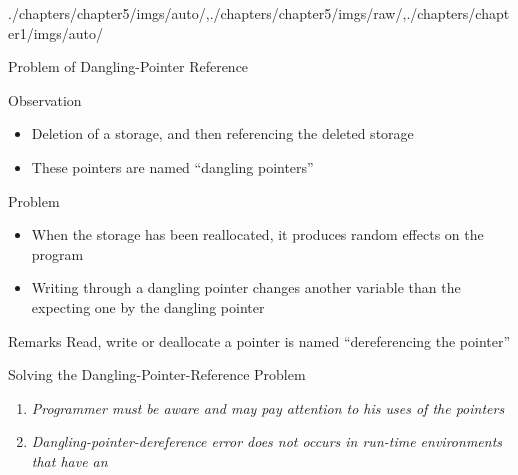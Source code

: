 \begin{graphicspathcontext}{{./chapters/chapter5/imgs/auto/},{./chapters/chapter5/imgs/raw/},{./chapters/chapter1/imgs/auto/}}
\begin{bibunit}[apalike]
\begin{frame}{Problem of Dangling-Pointer Reference}
	\begin{small}
		\begin{block}{Observation}
			\begin{itemize}
				\item Deletion of a storage, and then referencing the deleted storage
				\item These pointers are named ``dangling pointers''
			\end{itemize}
		\end{block}
		\begin{alertblock}{Problem}
			\begin{itemize}
				\item When the storage has been reallocated, it produces random effects on the program
				\item Writing through a dangling pointer changes another variable than the expecting one by the dangling pointer
			\end{itemize}
		\end{alertblock}
		\begin{block}{Remarks}
			Read, write or deallocate a pointer is named ``dereferencing the pointer''
		\end{block}
	\end{small}
\end{frame}

\begin{frame}{Solving the Dangling-Pointer-Reference Problem}
	\vspace{1cm}
	\begin{enumerate}
		\item \emph{Programmer must be aware and may pay attention to his uses of the pointers}
		\vspace{.5cm}
		\item \emph{Dangling-pointer-dereference error does not occurs in run-time environments that have an }
	\end{enumerate}
\end{frame}


\end{bibunit}
\end{graphicspathcontext}
